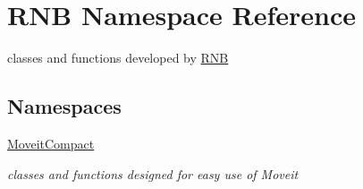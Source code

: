 \hypertarget{namespace_r_n_b}{}\section{R\+NB Namespace Reference}
\label{namespace_r_n_b}


classes and functions developed by \hyperlink{namespace_r_n_b}{R\+NB}  


\subsection*{Namespaces}
\begin{DoxyCompactItemize}
\item 
 \hyperlink{namespace_r_n_b_1_1_moveit_compact}{Moveit\+Compact}
\begin{DoxyCompactList}\small\item\em classes and functions designed for easy use of Moveit \end{DoxyCompactList}\end{DoxyCompactItemize}
